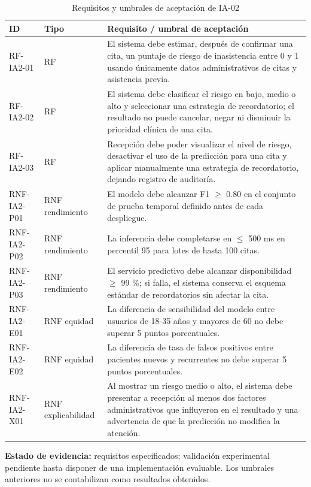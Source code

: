 \documentclass[11pt,a4paper]{article}
\begin{document}
\begin{longtable}{p{2.5cm}p{3.4cm}p{9.8cm}}
	\caption{Requisitos y umbrales de aceptación de IA-02}\\\toprule\textbf{ID}&\textbf{Tipo}&\textbf{Requisito / umbral de aceptación}\\\midrule\endhead
	RF-IA2-01 & RF & El sistema debe estimar, después de confirmar una cita, un puntaje de riesgo de inasistencia entre 0 y 1 usando únicamente datos administrativos de citas y asistencia previa. \\
	RF-IA2-02 & RF & El sistema debe clasificar el riesgo en bajo, medio o alto y seleccionar una estrategia de recordatorio; el resultado no puede cancelar, negar ni disminuir la prioridad clínica de una cita. \\
	RF-IA2-03 & RF & Recepción debe poder visualizar el nivel de riesgo, desactivar el uso de la predicción para una cita y aplicar manualmente una estrategia de recordatorio, dejando registro de auditoría. \\
	RNF-IA2-P01 & RNF rendimiento & El modelo debe alcanzar F1 $\geq$ 0.80 en el conjunto de prueba temporal definido antes de cada despliegue. \\
	RNF-IA2-P02 & RNF rendimiento & La inferencia debe completarse en $\leq$ 500 ms en percentil 95 para lotes de hasta 100 citas. \\
	RNF-IA2-P03 & RNF rendimiento & El servicio predictivo debe alcanzar disponibilidad $\geq$ 99 \%; si falla, el sistema conserva el esquema estándar de recordatorios sin afectar la cita. \\
	RNF-IA2-E01 & RNF equidad & La diferencia de sensibilidad del modelo entre usuarios de 18-35 años y mayores de 60 no debe superar 5 puntos porcentuales. \\
	RNF-IA2-E02 & RNF equidad & La diferencia de tasa de falsos positivos entre pacientes nuevos y recurrentes no debe superar 5 puntos porcentuales. \\
	RNF-IA2-X01 & RNF explicabilidad & Al mostrar un riesgo medio o alto, el sistema debe presentar a recepción al menos dos factores administrativos que influyeron en el resultado y una advertencia de que la predicción no modifica la atención. \\
	\bottomrule\end{longtable}

\textbf{Estado de evidencia:} requisitos especificados; validación experimental pendiente hasta disponer de una implementación evaluable. Los umbrales anteriores no se contabilizan como resultados obtenidos.
\end{document}
